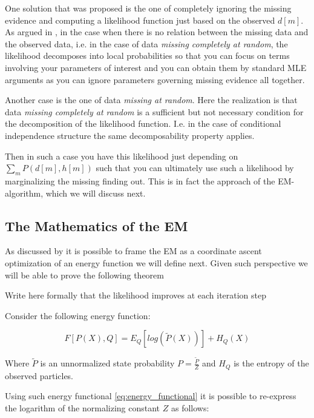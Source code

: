\documentclass[11pt]{article}
\begin{document}
\begin{article}
One solution that was proposed is the one of completely ignoring
the missing evidence and computing a likelihood function just based
on the observed \(d[m]\). As argued in \cite{koller2009probabilistic},
in the case when there is no relation between the missing data and
the observed data, i.e. in the case of data \emph{missing completely at
random}, the likelihood decomposes into local probabilities so that
you can focus on terms involving your parameters of interest and
you can obtain them by standard MLE arguments as you can ignore
parameters governing missing evidence all together.

Another case is the one of data \emph{missing at random}. Here the
realization is that data \emph{missing completely at random} is a
sufficient but not necessary condition for the decomposition of the
likelihood function. I.e. in the case of conditional independence
structure the same decomposability property applies.

Then in such a case you have this likelihood just depending on
\(\sum_m P(d[m], h[m])\) such that you can ultimately use such a
likelihood by marginalizing the missing finding out. This is in
fact the approach of the EM-algorithm, which we will discuss next.

\subsection{The Mathematics of the EM}
\label{math_em}
As discussed by \cite{koller2009probabilistic} it is possible to frame
the EM as a coordinate ascent optimization of an energy function we
will define next. Given such perspective we will be able to prove the
following theorem

\begin{theorem}\label{thm:one}
Write here formally that the likelihood improves at each iteration step
\end{theorem}

Consider the following energy function:

\begin{equation} \label{eq:energy_functional}
F[P(X), Q] = E_Q[log (\tilde{P}(X))] + H_Q (X)
\end{equation}

Where \(\tilde{P}\) is an unnormalized state probability \(P =
   \frac{\tilde{P}}{Z}\) and \(H_Q\) is the entropy of the observed
particles. 

Using such energy functional \ref{eq:energy_functional} it is possible
to re-express the logarithm of the normalizing constant \(Z\) as
follows:


\end{article}
\end{document}
